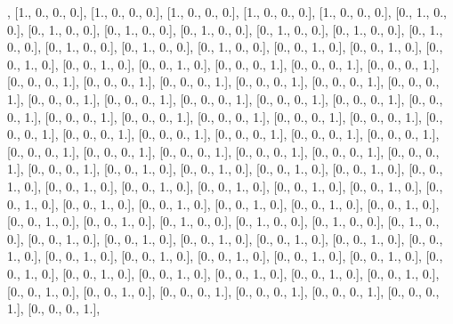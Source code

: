 \documentclass[letterpaper,10pt,english]{jupyterBook}
\begin{document}
\begin{sphinxVerbatim}[commandchars=\\\{\}]
        [1., 0., 0., 0.],
        [1., 0., 0., 0.],
        [1., 0., 0., 0.],
        [1., 0., 0., 0.],
        [1., 0., 0., 0.],
        [1., 0., 0., 0.],
        [0., 1., 0., 0.],
        [0., 1., 0., 0.],
        [0., 1., 0., 0.],
        [0., 1., 0., 0.],
        [0., 1., 0., 0.],
        [0., 1., 0., 0.],
        [0., 1., 0., 0.],
        [0., 1., 0., 0.],
        [0., 1., 0., 0.],
        [0., 1., 0., 0.],
        [0., 0., 1., 0.],
        [0., 0., 1., 0.],
        [0., 0., 1., 0.],
        [0., 0., 1., 0.],
        [0., 0., 1., 0.],
        [0., 0., 0., 1.],
        [0., 0., 0., 1.],
        [0., 0., 0., 1.],
        [0., 0., 0., 1.],
        [0., 0., 0., 1.],
        [0., 0., 0., 1.],
        [0., 0., 0., 1.],
        [0., 0., 0., 1.],
        [0., 0., 0., 1.],
        [0., 0., 0., 1.],
        [0., 0., 0., 1.],
        [0., 0., 0., 1.],
        [0., 0., 0., 1.],
        [0., 0., 0., 1.],
        [0., 0., 0., 1.],
        [0., 0., 0., 1.],
        [0., 0., 0., 1.],
        [0., 0., 0., 1.],
        [0., 0., 0., 1.],
        [0., 0., 0., 1.],
        [0., 0., 0., 1.],
        [0., 0., 0., 1.],
        [0., 0., 0., 1.],
        [0., 0., 0., 1.],
        [0., 0., 0., 1.],
        [0., 0., 0., 1.],
        [0., 0., 0., 1.],
        [0., 0., 0., 1.],
        [0., 0., 0., 1.],
        [0., 0., 0., 1.],
        [0., 0., 0., 1.],
        [0., 0., 0., 1.],
        [0., 0., 0., 1.],
        [0., 0., 1., 0.],
        [0., 0., 1., 0.],
        [0., 0., 1., 0.],
        [0., 0., 1., 0.],
        [0., 0., 1., 0.],
        [0., 0., 1., 0.],
        [0., 0., 1., 0.],
        [0., 0., 1., 0.],
        [0., 0., 1., 0.],
        [0., 0., 1., 0.],
        [0., 0., 1., 0.],
        [0., 0., 1., 0.],
        [0., 0., 1., 0.],
        [0., 0., 1., 0.],
        [0., 0., 1., 0.],
        [0., 0., 1., 0.],
        [0., 0., 1., 0.],
        [0., 0., 1., 0.],
        [0., 1., 0., 0.],
        [0., 1., 0., 0.],
        [0., 1., 0., 0.],
        [0., 1., 0., 0.],
        [0., 0., 1., 0.],
        [0., 0., 1., 0.],
        [0., 0., 1., 0.],
        [0., 0., 1., 0.],
        [0., 0., 1., 0.],
        [0., 0., 1., 0.],
        [0., 0., 1., 0.],
        [0., 0., 1., 0.],
        [0., 0., 1., 0.],
        [0., 0., 1., 0.],
        [0., 0., 1., 0.],
        [0., 0., 1., 0.],
        [0., 0., 1., 0.],
        [0., 0., 1., 0.],
        [0., 0., 1., 0.],
        [0., 0., 1., 0.],
        [0., 0., 1., 0.],
        [0., 0., 1., 0.],
        [0., 0., 1., 0.],
        [0., 0., 0., 1.],
        [0., 0., 0., 1.],
        [0., 0., 0., 1.],
        [0., 0., 0., 1.],
        [0., 0., 0., 1.],

\end{sphinxVerbatim}
\end{document}
